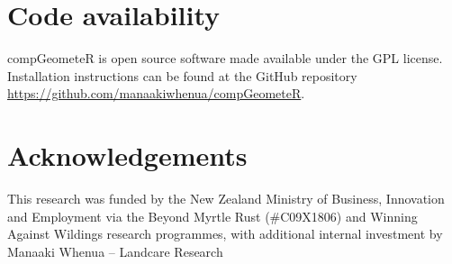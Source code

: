 \documentclass[12pt, a4paper]{article}
\begin{document}
\section{Code availability}

compGeometeR is open source software made available under the GPL license. Installation
instructions can be found at the GitHub repository \url{https://github.com/manaakiwhenua/compGeometeR}.

\section{Acknowledgements}

This research was funded by the New Zealand Ministry of Business, Innovation and Employment via the Beyond Myrtle Rust (\#C09X1806) and Winning Against Wildings research programmes, with additional internal investment by Manaaki Whenua -- Landcare Research



\end{document}
